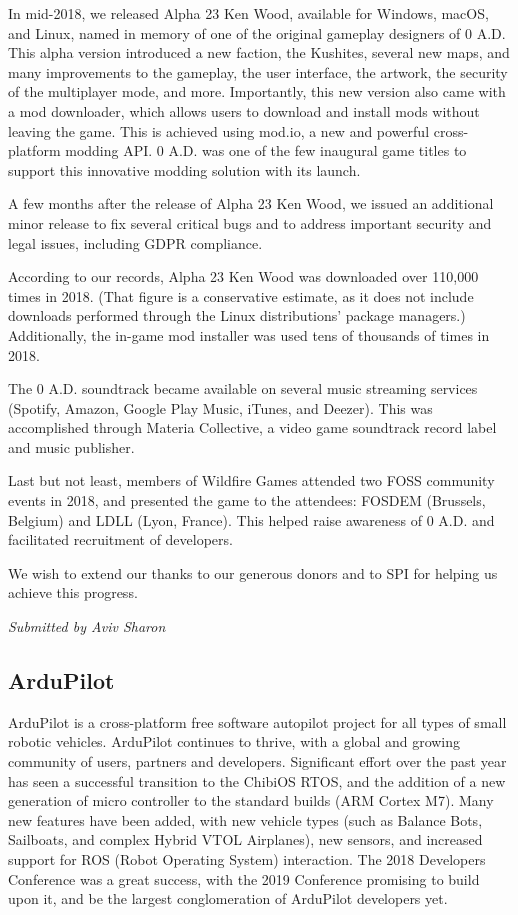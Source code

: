 \documentclass[a4paper]{report}
\begin{document}
In mid-2018, we released Alpha 23 Ken Wood, available for Windows,
macOS, and Linux, named in memory of one of the original gameplay
designers of 0 A.D. This alpha version introduced a new faction, the
Kushites, several new maps, and many improvements to the gameplay, the
user interface, the artwork, the security of the multiplayer mode, and
more.  Importantly, this new version also came with a mod downloader,
which allows users to download and install mods without leaving the
game. This is achieved using mod.io, a new and powerful cross-platform
modding API.  0 A.D. was one of the few inaugural game titles to support
this innovative modding solution with its launch.

A few months after the release of Alpha 23 Ken Wood, we issued an
additional minor release to fix several critical bugs and to address
important security and legal issues, including GDPR compliance.

According to our records, Alpha 23 Ken Wood was downloaded over 110,000
times in 2018. (That figure is a conservative estimate, as it does not
include downloads performed through the Linux distributions' package
managers.) Additionally, the in-game mod installer was used tens of
thousands of times in 2018.

The 0 A.D. soundtrack became available on several music streaming
services (Spotify, Amazon, Google Play Music, iTunes, and Deezer). This
was accomplished through Materia Collective, a video game soundtrack
record label and music publisher.

Last but not least, members of Wildfire Games attended two FOSS
community events in 2018, and presented the game to the attendees:
FOSDEM (Brussels, Belgium) and LDLL (Lyon, France). This helped raise
awareness of 0 A.D. and facilitated recruitment of developers.

We wish to extend our thanks to our generous donors and to SPI for
helping us achieve this progress.

{\em Submitted by Aviv Sharon}

\subsection{ArduPilot}

ArduPilot is a cross-platform free software autopilot project for all
types of small robotic vehicles.  ArduPilot continues to thrive, with a
global and growing community of users, partners and developers.
Significant effort over the past year has seen a successful transition
to the ChibiOS RTOS, and the addition of a new generation of micro
controller to the standard builds (ARM Cortex M7).  Many new features
have been added, with new vehicle types (such as Balance Bots,
Sailboats, and complex Hybrid VTOL Airplanes), new sensors, and
increased support for ROS (Robot Operating System) interaction.  The
2018 Developers Conference was a great success, with the 2019 Conference
promising to build upon it, and be the largest conglomeration of
ArduPilot developers yet.
\end{document}

